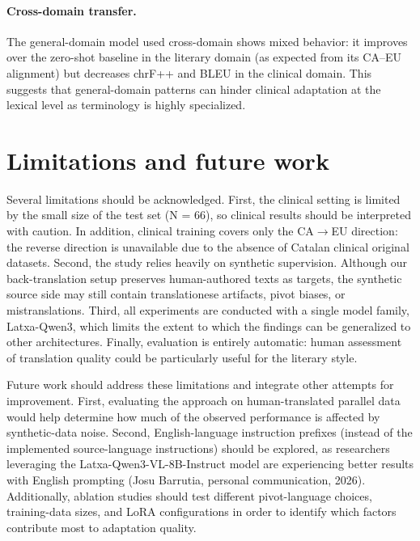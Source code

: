 \documentclass[11pt,a4paper]{article}
\begin{document}
\paragraph{Cross-domain transfer.}
The general-domain model used cross-domain shows mixed behavior: it improves
over the zero-shot baseline in the literary domain (as expected from its CA--EU
alignment) but decreases chrF++ and BLEU in the clinical domain. This suggests
that general-domain patterns can hinder
clinical adaptation at the lexical level as terminology
is highly specialized.

\section{Limitations and future work}
\label{sec:limitations}

Several limitations should be acknowledged.
First, the clinical setting is
limited by the small size of the test set (N = 66), so clinical results
should be interpreted with caution. In addition, clinical training covers only the CA$\to$EU direction: the
reverse direction is unavailable due to the absence of Catalan
clinical original datasets. Second, the study
relies heavily on synthetic supervision. Although our back-translation
setup preserves human-authored texts as targets, the synthetic source
side may still contain translationese artifacts, pivot biases, or mistranslations. Third, all experiments are conducted
with a single model family, Latxa-Qwen3, which limits the extent to which
the findings can be generalized to other architectures. Finally, evaluation is entirely automatic: human assessment
of translation quality could be particularly useful for the literary style.

Future work should address these limitations and integrate other attempts for improvement. 
First, evaluating the approach on human-translated parallel data would
help determine how much of the observed performance is affected by
synthetic-data noise.
Second, English-language instruction prefixes (instead of the implemented source-language instructions) should be explored, as researchers leveraging the Latxa-Qwen3-VL-8B-Instruct model are experiencing better results with English prompting (Josu Barrutia, personal communication, 2026). Additionally, ablation studies should test different pivot-language
choices, training-data sizes, and LoRA configurations in order to
identify which factors contribute most to adaptation quality.
\end{document}
